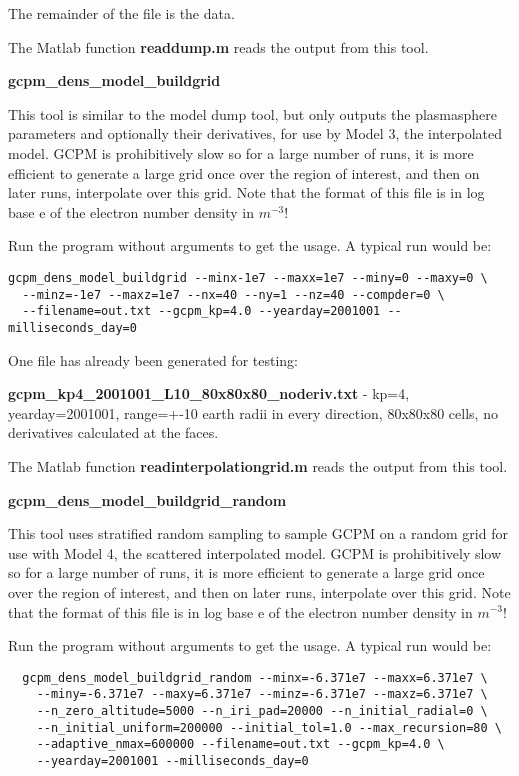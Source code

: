 \documentclass[10pt]{article}
\begin{document}
The remainder of the file is the data.

The Matlab function {\bf readdump.m} reads the output from this tool.

{\bf gcpm\_dens\_model\_buildgrid}

This tool is similar to the model dump tool, but only outputs the
plasmasphere parameters and optionally their derivatives, for use by
Model 3, the interpolated model.  GCPM is prohibitively slow so for a
large number of runs, it is more efficient to generate a large grid
once over the region of interest, and then on later runs, interpolate
over this grid.  Note that the format of this file is in log base e of
the electron number density in $m^{-3}$!

Run the program without arguments to get the usage.  A typical run
would be:
\begin{verbatim}
gcpm_dens_model_buildgrid --minx-1e7 --maxx=1e7 --miny=0 --maxy=0 \
  --minz=-1e7 --maxz=1e7 --nx=40 --ny=1 --nz=40 --compder=0 \
  --filename=out.txt --gcpm_kp=4.0 --yearday=2001001 --milliseconds_day=0
\end{verbatim}

One file has already been generated for testing:

{\bf gcpm\_kp4\_2001001\_L10\_80x80x80\_noderiv.txt} - kp=4,
yearday=2001001, range=+-10 earth radii in every direction,
80x80x80 cells, no derivatives calculated at the faces.

The Matlab function {\bf readinterpolationgrid.m} reads the output
from this tool.  

{\bf gcpm\_dens\_model\_buildgrid\_random}

This tool uses stratified random sampling to sample GCPM on a random
grid for use with Model 4, the scattered interpolated model.  GCPM is
prohibitively slow so for a large number of runs, it is more efficient
to generate a large grid once over the region of interest, and then on
later runs, interpolate over this grid.  Note that the format of this
file is in log base e of the electron number density in $m^{-3}$!

Run the program without arguments to get the usage.  A typical run
would be:
\begin{verbatim}
  gcpm_dens_model_buildgrid_random --minx=-6.371e7 --maxx=6.371e7 \
    --miny=-6.371e7 --maxy=6.371e7 --minz=-6.371e7 --maxz=6.371e7 \
    --n_zero_altitude=5000 --n_iri_pad=20000 --n_initial_radial=0 \
    --n_initial_uniform=200000 --initial_tol=1.0 --max_recursion=80 \
    --adaptive_nmax=600000 --filename=out.txt --gcpm_kp=4.0 \
    --yearday=2001001 --milliseconds_day=0
\end{verbatim}
\end{document}
